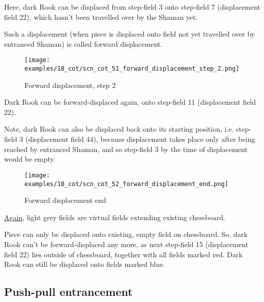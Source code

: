 Here, dark Rook can be displaced from step-field 3 onto step-field 7 (displacement
field 22), which hasn't been travelled over by the Shaman yet.

Such a displacement (when piece is displaced onto field not yet travelled over by
entranced Shaman) is called forward displacement.

\clearpage %

\noindent
\begin{figure}[!h]
\texttt{[image: examples/18\_cot/scn\_cot\_51\_forward\_displacement\_step\_2.png]}
\caption{Forward displacement, step 2}
\label{fig:scn_cot_51_forward_displacement_step_2}
\end{figure}

Dark Rook can be forward-displaced again, onto step-field 11 (displacement field 22).

Note, dark Rook can also be displaced back onto its starting position, i.e. step-field
3 (displacement field 44), because displacement takes place only after being reached
by entranced Shaman, and so step-field 3 by the time of displacement would be empty.

\clearpage %

\noindent
\begin{figure}[!h]
\texttt{[image: examples/18\_cot/scn\_cot\_52\_forward\_displacement\_end.png]}
\caption{Forward displacement end}
\label{fig:scn_cot_52_forward_displacement_end}
\end{figure}

\hyperref[fig:scn_hd_06_centaur_off_board]{Again},
light grey fields are virtual fields extending existing chessboard.

Piece can only be displaced onto existing, empty field on chessboard. So, dark Rook
can't be forward-displaced any more, as next step-field 15 (displacement field 22)
lies outside of chessboard, together with all fields marked red. Dark Rook can still
be displaced onto fields marked blue.

\clearpage %

\subsection*{Push-pull entrancement}
\label{sec:Conquest of Tlalocan/Trance-journey/Push-pull entrancement}

